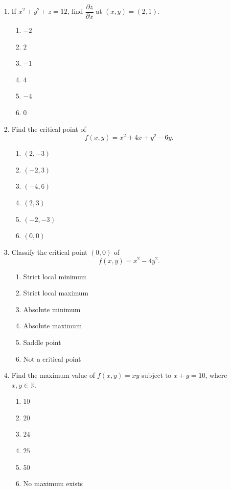 \documentclass[a4paper,12pt]{article}
\theoremstyle{mystyle}
\numberwithin{equation}{section}
\numberwithin{theorem}{section}
\numberwithin{proposition}{section}
\numberwithin{example}{section}
\numberwithin{remark}{section}
\numberwithin{lemma}{section}
\numberwithin{corollary}{section}
\numberwithin{definition}{section}
\begin{document}
\begin{enumerate}[label=\textbf{Question \arabic*.}, leftmargin=*]
\item If \(x^{2}+y^{2}+z=12\), find
\(\dfrac{\partial z}{\partial x}\) at \((x,y)=(2,1)\).
\begin{enumerate}[label=(\Alph*)]
\item \(-2\)
\item \(2\)
\item \(-1\)
\item \(4\)
\item \(-4\)
\item \(0\)
\end{enumerate}

\item Find the critical point of
\[
f(x,y)=x^{2}+4x+y^{2}-6y.
\]
\begin{enumerate}[label=(\Alph*)]
\item \((2,-3)\)
\item \((-2,3)\)
\item \((-4,6)\)
\item \((2,3)\)
\item \((-2,-3)\)
\item \((0,0)\)
\end{enumerate}

\item Classify the critical point \((0,0)\) of
\[
f(x,y)=x^{2}-4y^{2}.
\]
\begin{enumerate}[label=(\Alph*)]
\item Strict local minimum
\item Strict local maximum
\item Absolute minimum
\item Absolute maximum
\item Saddle point
\item Not a critical point
\end{enumerate}

\item Find the maximum value of \(f(x,y)=xy\) subject to
\(x+y=10\), where \(x,y\in\mathbb{R}\).
\begin{enumerate}[label=(\Alph*)]
\item \(10\)
\item \(20\)
\item \(24\)
\item \(25\)
\item \(50\)
\item No maximum exists
\end{enumerate}

\end{enumerate}
\end{document}

